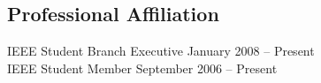 \documentclass[margin,line]{resume}
\begin{document}
\begin{resume}
    \section{\mysidestyle Professional Affiliation}
    IEEE Student Branch Executive \hfill January 2008 -- Present\vspace{1mm}\\
    IEEE Student Member \hfill September 2006 -- Present

%
%

\end{resume}
\end{document}
